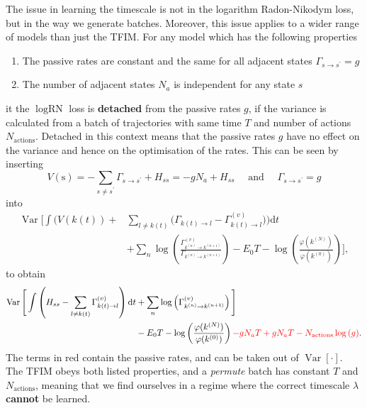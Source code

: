 The issue in learning the timescale is not in the logarithm Radon-Nikodym loss, but in the way we generate batches. Moreover, this issue applies to a wider range of models than just the TFIM. For any model which has the following properties
\begin{enumerate}
	\item The passive rates are constant and the same for all adjacent states $\Gamma_{s \rightarrow s^{\prime}}=g$
	\item The number of adjacent states $N_a$ is independent for any state $s$
\end{enumerate}
it the $\log \text{RN}$ loss is \textbf{detached} from the passive rates $g$, if the variance is calculated from a batch of trajectories with same time $T$ and number of actions $N_{\text{actions}}$. Detached in this context means that the passive rates $g$ have no effect on the variance and hence on the optimisation of the rates. This can be seen by inserting 
\begin{equation}
	V(\mathrm{s})=-\sum_{s \neq s^{\prime}} \Gamma_{s \rightarrow s^{\prime}}+H_{s s}=-g N_a + H_{s s} \quad \text{ and } \quad \Gamma_{s \rightarrow s^{\prime}}=g
\end{equation}
into
\begin{equation}
	\begin{aligned}
			{\operatorname{Var}}\Bigg[\int\bigg(V(k(t))+&\sum_{l \neq k(t)}\bigg(\Gamma_{k(t) \rightarrow l}-\Gamma_{k(t) \rightarrow l}^{(v)}\bigg)\bigg) \mathrm{d} t \\
		&+\sum_{n} \log \left(\frac{\Gamma_{k^{(n)} \rightarrow k^{(n+1)}}^{(v)}}{\Gamma_{k^{(n)} \rightarrow k^{(n+1)}}}\right)-E_{0} T-\log \left(\frac{\varphi(k^{(N)})}{\varphi(k^{(0)})}\right)
		\Bigg],
	\end{aligned}
\end{equation}
to obtain
\begin{equation}
	\begin{aligned}
		\operatorname{Var}\Bigg[\int\left(H_{s s}-\sum_{l \neq k(t)}\Gamma_{k(t) \rightarrow l}^{(v)}\right)\mathrm{d} t 
		&+ \sum_{n} \log \left(\Gamma_{k^{(n)} \rightarrow k^{(n+1)}}^{(v)}\right)\Bigg] \\ &-E_{0} T -\log \left(\frac{\varphi(k^{(N)})}{\varphi(k^{(0)})}\right) \textcolor{red}{- gN_aT + gN_aT - N_{\text{actions}}\log{(g)}}.
	\end{aligned}
\end{equation}
The terms in red contain the passive rates, and can be taken out of $\operatorname{Var}[\cdot]$. The TFIM obeys both listed properties, and a \emph{permute} batch has constant $T$ and $N_{\text{actions}}$, meaning that we find ourselves in a regime where the correct timescale $\lambda$ \textbf{cannot} be learned. 

